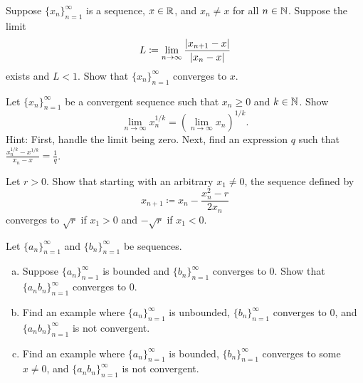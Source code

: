 \begin{exercise}
Suppose $\{ x_n \}_{n=1}^\infty$ is a sequence, $x \in {\mathbb{R}}$, and $x_n \neq x$ for
all $n \in {\mathbb{N}}$.  Suppose the limit
\begin{equation*}
L \coloneqq \lim_{n \to \infty} \frac{\lvert {x_{n+1}-x} \rvert}{\lvert {x_n-x} \rvert}
\end{equation*}
exists and $L < 1$.  Show that $\{ x_n \}_{n=1}^\infty$ converges to $x$.
\end{exercise}

\begin{exercise}[Challenging]
Let $\{ x_n \}_{n=1}^\infty$ be a convergent sequence such
that $x_n \geq 0$ and $k \in {\mathbb{N}}$.
Show
\begin{equation*}
\lim_{n\to\infty} x_n^{1/k} =
{\left( \lim_{n\to\infty} x_n \right)}^{1/k} .
\end{equation*}
Hint: First, handle the limit being zero.
Next, find an expression $q$ such that $\frac{x_n^{1/k}-x^{1/k}}{x_n-x} =
\frac{1}{q}$.
\end{exercise}

\begin{exercise}
Let $r > 0$.  Show that starting with an arbitrary $x_1 \neq 0$, the sequence
defined by
\begin{equation*}
x_{n+1} \coloneqq x_n - \frac{x_n^2-r}{2x_n}
\end{equation*}
converges to $\sqrt{r}$ if $x_1 > 0$ and $-\sqrt{r}$ if $x_1 < 0$.
\end{exercise}

\begin{samepage}
\begin{exercise}
Let $\{ a_n \}_{n=1}^\infty$ and $\{ b_n \}_{n=1}^\infty$ be sequences.
\begin{enumerate}[a)]
\item
Suppose $\{ a_n \}_{n=1}^\infty$ is bounded and $\{ b_n \}_{n=1}^\infty$ converges to 0.
Show that $\{ a_n b_n \}_{n=1}^\infty$ converges to 0.
\item
Find an example where $\{ a_n \}_{n=1}^\infty$ is unbounded, $\{ b_n \}_{n=1}^\infty$ converges to
0, and $\{ a_n b_n \}_{n=1}^\infty$ is not convergent.
\item
Find an example where $\{ a_n \}_{n=1}^\infty$ is bounded, $\{ b_n \}_{n=1}^\infty$ converges to
some $x \neq 0$, and $\{ a_n b_n \}_{n=1}^\infty$ is not convergent.
\end{enumerate}
\end{exercise}
\end{samepage}

